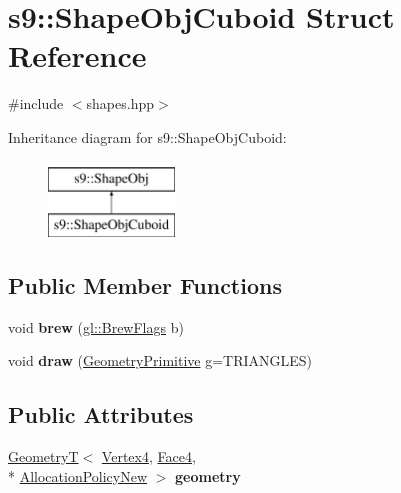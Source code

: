 \hypertarget{structs9_1_1ShapeObjCuboid}{\section{s9\-:\-:Shape\-Obj\-Cuboid Struct Reference}
\label{structs9_1_1ShapeObjCuboid}
}


{\ttfamily \#include $<$shapes.\-hpp$>$}

Inheritance diagram for s9\-:\-:Shape\-Obj\-Cuboid\-:\begin{figure}[H]
\begin{center}
\leavevmode
\includegraphics[height=2.000000cm]{structs9_1_1ShapeObjCuboid}
\end{center}
\end{figure}
\subsection*{Public Member Functions}
\begin{DoxyCompactItemize}
\item 
\hypertarget{structs9_1_1ShapeObjCuboid_a69b663f6e00bed55efa5863b86f6a5f9}{void {\bfseries brew} (\hyperlink{structs9_1_1gl_1_1BrewFlags}{gl\-::\-Brew\-Flags} b)}\label{structs9_1_1ShapeObjCuboid_a69b663f6e00bed55efa5863b86f6a5f9}

\item 
\hypertarget{structs9_1_1ShapeObjCuboid_a85f82e721e5fd48270da15adbd66c93c}{void {\bfseries draw} (\hyperlink{namespaces9_ad57d1332f8fd67d23f6a1d3520ab785c}{Geometry\-Primitive} g=T\-R\-I\-A\-N\-G\-L\-E\-S)}\label{structs9_1_1ShapeObjCuboid_a85f82e721e5fd48270da15adbd66c93c}

\end{DoxyCompactItemize}
\subsection*{Public Attributes}
\begin{DoxyCompactItemize}
\item 
\hypertarget{structs9_1_1ShapeObjCuboid_af475e3bceaba7566b8d7614e9218bad4}{\hyperlink{classs9_1_1GeometryT}{Geometry\-T}$<$ \hyperlink{structs9_1_1VertexT}{Vertex4}, \hyperlink{structs9_1_1FaceT}{Face4}, \\*
\hyperlink{classs9_1_1AllocationPolicyNew}{Allocation\-Policy\-New} $>$ {\bfseries geometry}}\label{structs9_1_1ShapeObjCuboid_af475e3bceaba7566b8d7614e9218bad4}

\end{DoxyCompactItemize}


